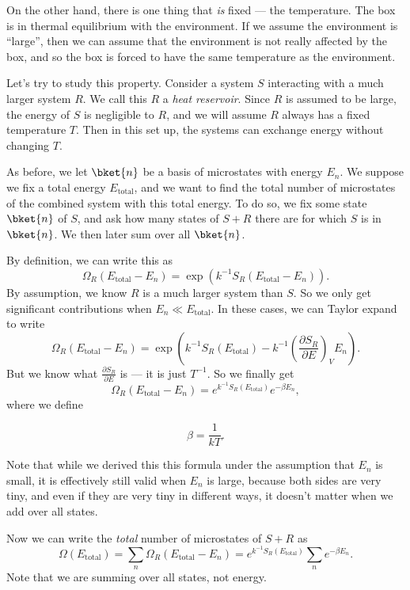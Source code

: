 \documentclass[a4paper]{article}
\begin{document}
On the other hand, there is one thing that \emph{is} fixed --- the temperature. The box is in thermal equilibrium with the environment. If we assume the environment is ``large'', then we can assume that the environment is not really affected by the box, and so the box is forced to have the same temperature as the environment.

Let's try to study this property. Consider a system $S$ interacting with a much larger system $R$. We call this $R$ a \emph{heat reservoir}. Since $R$ is assumed to be large, the energy of $S$ is negligible to $R$, and we will assume $R$ always has a fixed temperature $T$. Then in this set up, the systems can exchange energy without changing $T$.

As before, we let $\bket{n}$ be a basis of microstates with energy $E_n$. We suppose we fix a total energy $E_{\mathrm{total}}$, and we want to find the total number of microstates of the combined system with this total energy. To do so, we fix some state $\bket{n}$ of $S$, and ask how many states of $S + R$ there are for which $S$ is in $\bket{n}$. We then later sum over all $\bket{n}$.

By definition, we can write this as
\[
  \Omega_R(E_{\mathrm{total}} - E_n) = \exp\left(k^{-1} S_R(E_{\mathrm{total}} - E_n)\right).
\]
By assumption, we know $R$ is a much larger system than $S$. So we only get significant contributions when $E_n \ll E_{\mathrm{total}}$. In these cases, we can Taylor expand to write
\[
  \Omega_R(E_{\mathrm{total}} - E_n) = \exp\left(k^{-1} S_R(E_{\mathrm{total}}) - k^{-1}\left(\frac{\partial S_R}{\partial E}\right)_V E_n\right).
\]
But we know what $\frac{\partial S_R}{\partial E}$ is --- it is just $T^{-1}$. So we finally get
\[
  \Omega_R(E_{\mathrm{total}} - E_n) = e^{k^{-1}S_R(E_{\mathrm{total}})} e^{-\beta E_n},
\]
where we define
\begin{defi}[$\beta$]\index{$\beta$}
  \[
    \beta = \frac{1}{kT}.
  \]
\end{defi}
Note that while we derived this this formula under the assumption that $E_n$ is small, it is effectively still valid when $E_n$ is large, because both sides are very tiny, and even if they are very tiny in different ways, it doesn't matter when we add over all states.

Now we can write the \emph{total} number of microstates of $S + R$ as
\[
  \Omega(E_{\mathrm{total}}) = \sum_n \Omega_R(E_{\mathrm{total}} - E_n) = e^{k^{-1} S_R(E_{\mathrm{total}})} \sum_n e^{-\beta E_n}.
\]
Note that we are summing over all states, not energy.
\end{document}
